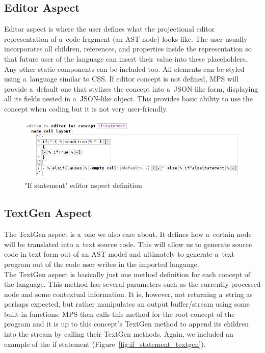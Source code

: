 \subsection{Editor Aspect}
\label{chap:about_editor_aspect}

Editor aspect is where the user defines what the projectional editor representation of a~code fragment (an AST node) looks like.
The user usually incorporates all children, references, and properties inside the representation so that future user of the language can insert their value into these placeholders.
Any other static components can be included too.
All elements can be styled using a~language similar to CSS.
If editor concept is not defined, MPS will provide a~default one that stylizes the concept into a~JSON-like form, displaying all its fields nested in a~JSON-like object.
This provides basic ability to use the concept when coding but it is not very user-friendly.

\begin{figure}[h]
	\centering
	\includegraphics[width=\textwidth]{./img/if_statement_editor_definition.png}
	\caption{"If statement" editor aspect definition}
	\label{fig:if_editor_definition}
\end{figure}

\subsection{TextGen Aspect}
The TextGen aspect is a~one we also care about.
It defines how a~certain node will be translated into a~text source code.
This will allow us to generate source code in text form out of an AST model and ultimately to generate a~text program out of the code user writes in the imported language.
\\

The TextGen aspect is basically just one method definition for each concept of the language.
This method has several parameters such as the currently processed node and some contextual information.
It is, however, not returning a~string as perhaps expected, but rather manipulates an output buffer/stream using some built-in functions.
MPS then calls this method for the root concept of the program and it is up to this concept's TextGen method to append its children into the stream by calling their TextGen methods.
Again, we included an example of the if statement (Figure~\ref{fig:if_statement_textgen}).

